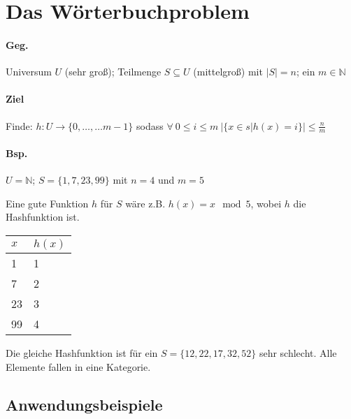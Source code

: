 \section{Das Wörterbuchproblem}

\paragraph*{Geg.} Universum $U$ (sehr groß); Teilmenge $S \subseteq U$ (mittelgroß) mit $|S|=n$; ein $m \in \mathbb{N}$

\paragraph*{Ziel} Finde: $h: U \rightarrow \{ 0,\dots,\dots m-1 \}$ sodass $\forall\ 0 \leq i \leq m\ \big| \{ x \in s | h(x)=i \} \big| \leq \frac{n}{m}$

\paragraph*{Bsp.} $U=\mathbb{N}$; $S=\{ 1,7,23,99 \}$ mit $n=4$ und $m=5$

Eine gute Funktion $h$ für $S$ wäre z.B. $h(x)=x \mod 5$, wobei $h$ die Hashfunktion ist.
\begin{table}[htb!]
\centering
\begin{tabular}{l|l}
$x$ & $h(x)$ \\ 
\hline 
1 & 1 \\ 
7 & 2 \\ 
23 & 3 \\ 
99 & 4 \\ 
\end{tabular} 
\end{table}

Die gleiche Hashfunktion ist für ein $S = \{ 12,22,17,32,52 \}$ sehr schlecht. Alle Elemente fallen in eine Kategorie.

\subsection{Anwendungsbeispiele}
